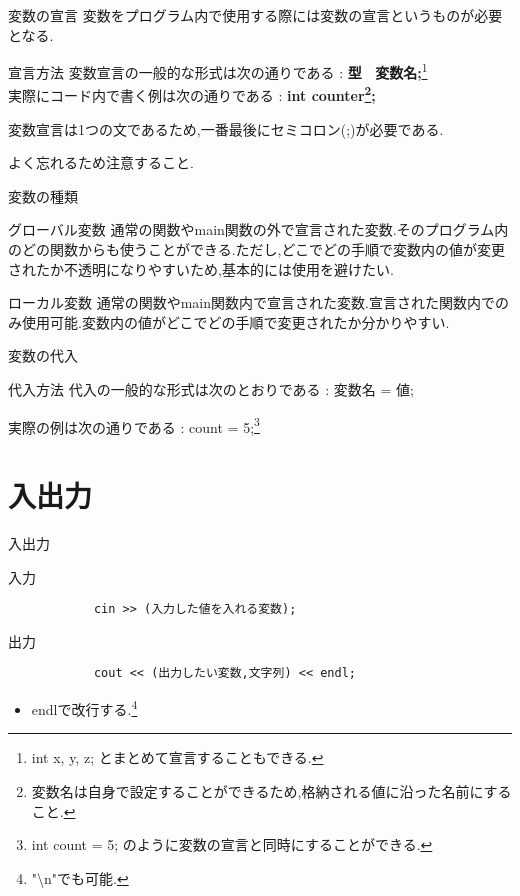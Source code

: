 \documentclass[xdvipdfmx, 8pt, t]{beamer}
\begin{document}
\begin{frame}{変数の宣言}
    変数をプログラム内で使用する際には変数の宣言というものが必要となる.
    \begin{block}{宣言方法}
        変数宣言の一般的な形式は次の通りである : \textbf{型 \mbox{ }変数名;}\footnote{int x, y, z; とまとめて宣言することもできる.}
        \mbox{}\\
        
        実際にコード内で書く例は次の通りである : \textbf{int counter\footnote{変数名は自身で設定することができるため,格納される値に沿った名前にすること.};}
    \end{block}
    \begin{alertblock}{}
        変数宣言は1つの文であるため,一番最後にセミコロン(;)が必要である.
        
        よく忘れるため注意すること.
    \end{alertblock}
        
    
\end{frame}
\begin{frame}{変数の種類}
    \begin{block}{グローバル変数}
    通常の関数やmain関数の外で宣言された変数.そのプログラム内のどの関数からも使うことができる.ただし,どこでどの手順で変数内の値が変更されたか不透明になりやすいため,基本的には使用を避けたい.
    \end{block}
    \begin{block}{ローカル変数}
        通常の関数やmain関数内で宣言された変数.宣言された関数内でのみ使用可能.変数内の値がどこでどの手順で変更されたか分かりやすい.
    \end{block}
\end{frame}
\begin{frame}{変数の代入}
    \begin{block}{代入方法}
        代入の一般的な形式は次のとおりである : 変数名 = 値;
        
        実際の例は次の通りである : count = 5;\footnote{int count = 5; のように変数の宣言と同時にすることができる.}
    \end{block}
\end{frame}
\section{入出力}
\begin{frame}[fragile]{入出力}
    \begin{block}{入力}
        \begin{lstlisting}
            cin >> (入力した値を入れる変数);
        \end{lstlisting}
    \end{block}
    \begin{block}{出力}
        \begin{lstlisting}
            cout << (出力したい変数,文字列) << endl;
        \end{lstlisting}
        \begin{itemize}
            \item endlで改行する.\footnote{"\textbackslash n"でも可能.}
        \end{itemize}
    \end{block}
\end{frame}
\end{document}
